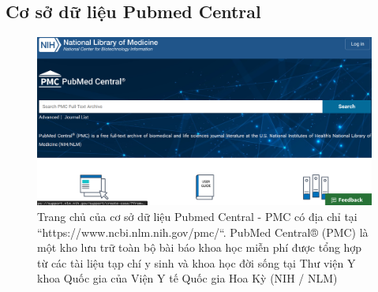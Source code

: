\documentclass[../DoAn.tex]{subfiles}
\begin{document}
\subsection{Cơ sở dữ liệu Pubmed Central}
\begin{figure}
\centering
\includegraphics[width=1.0\linewidth]{Hinh_ve/PMCHomepage.png}
\caption{Trang chủ của cơ sở dữ liệu Pubmed Central - PMC có địa chỉ tại ``https://www.ncbi.nlm.nih.gov/pmc/``. PubMed Central® (PMC) là một kho lưu trữ toàn bộ bài báo khoa học miễn phí được tổng hợp từ các tài liệu tạp chí y sinh và khoa học đời sống tại Thư viện Y khoa Quốc gia của Viện Y tế Quốc gia Hoa Kỳ (NIH / NLM)}
\label{fig:PMChomepage}
\end{figure}
\end{document}
